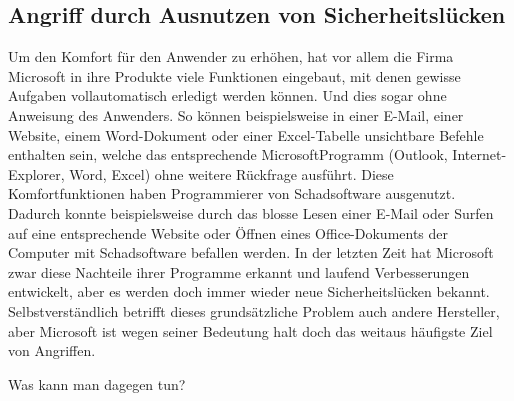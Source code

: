\subsection{Angriff durch Ausnutzen von Sicherheitslücken}

Um den Komfort für den Anwender zu erhöhen, hat vor allem die Firma Microsoft in ihre Produkte viele Funktionen eingebaut,
mit denen gewisse Aufgaben vollautomatisch erledigt werden können. Und dies sogar ohne Anweisung des Anwenders. So können beispielsweise
in einer E-Mail, einer Website, einem Word-Dokument oder einer Excel-Tabelle unsichtbare Befehle enthalten sein, welche das entsprechende
MicrosoftProgramm (Outlook, Internet-Explorer, Word, Excel) ohne weitere Rückfrage ausführt. Diese Komfortfunktionen haben
Programmierer von Schadsoftware ausgenutzt. Dadurch konnte beispielsweise durch das blosse Lesen einer E-Mail oder Surfen auf eine
entsprechende Website oder Öffnen eines Office-Dokuments der Computer mit Schadsoftware befallen werden. In der letzten Zeit hat
Microsoft zwar diese Nachteile ihrer Programme erkannt und laufend Verbesserungen entwickelt, aber es werden doch immer wieder neue
Sicherheitslücken bekannt. Selbstverständlich betrifft dieses grundsätzliche Problem auch andere Hersteller, aber Microsoft ist wegen
seiner Bedeutung halt doch das weitaus häufigste Ziel von Angriffen.

\medskip

Was kann man dagegen tun?

